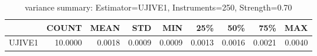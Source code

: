 \begin{table}[ht]
\centering
\caption{variance summary: Estimator=UJIVE1, Instruments=250, Strength=0.70}
\begin{tabular}{lrrrrrrrr}
\toprule
 & COUNT & MEAN & STD & MIN & 25\% & 50\% & 75\% & MAX \\
\midrule
UJIVE1 & 10.0000 & 0.0018 & 0.0009 & 0.0009 & 0.0013 & 0.0016 & 0.0021 & 0.0040 \\
\bottomrule
\end{tabular}
\end{table}
